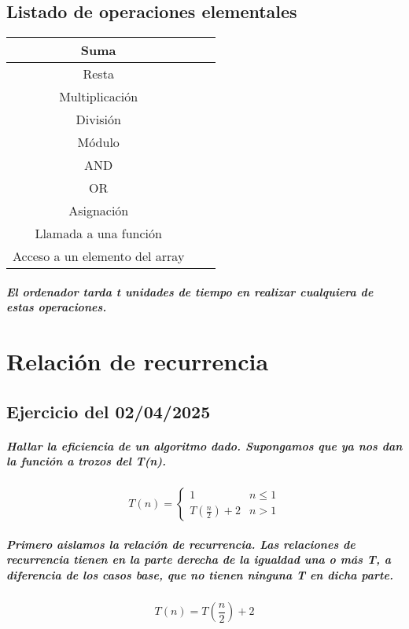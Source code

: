 \documentclass{book}
\begin{document}
      \section{Listado de operaciones elementales}
      \begin{center}
	      \begin{tabular}{|c|l|l|}
	      	\hline
	      	Suma \\
	      	\hline
	      	Resta \\
	      	\hline
	      	Multiplicación \\
	      	\hline
	      	División \\
	      	\hline
	      	Módulo \\
	      	\hline
	      	AND \\
	      	\hline
	      	OR \\
	      	\hline
	      	Asignación \\
	      	\hline
	      	Llamada a una función \\
	      	\hline
	      	Acceso a un elemento del array  \\
	      	\hline
	      \end{tabular}
      \end{center}
      \paragraph{El ordenador tarda \textit{t} unidades de tiempo en realizar cualquiera de estas operaciones.}
	\chapter{Relación de recurrencia}
	\section{Ejercicio del 02/04/2025}
	\paragraph{Hallar la eficiencia de un algoritmo dado. Supongamos que ya nos dan la función a trozos del T(n).}
	\[ T(n) = 	\begin{cases} 
					1 & n\leq 1 \\
					T(\frac{n}{2}) + 2 & n > 1 
				\end{cases}
       \]
       \paragraph{Primero aislamos la relación de recurrencia. Las relaciones de recurrencia tienen en la parte derecha de la igualdad una o más T, a diferencia de los casos base, que no tienen ninguna T en dicha parte.}
      \begin{equation}
	      T(n) = T(\frac{n}{2}) + 2  
      \end{equation}
\end{document}
